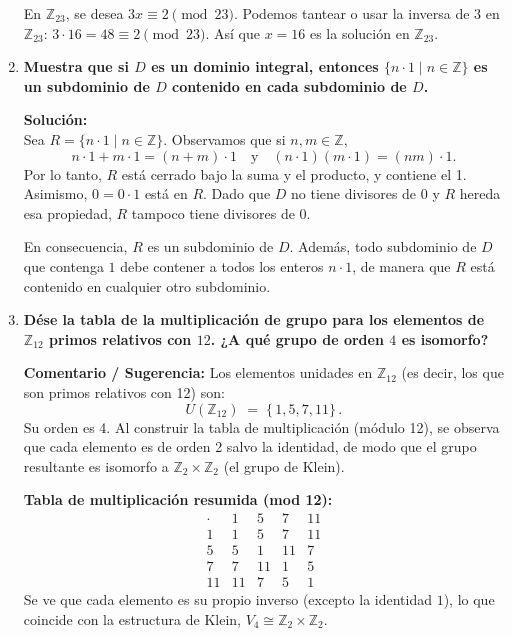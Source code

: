 \documentclass[12pt]{article}
\theoremstyle{definition}
\theoremstyle{remark}
\begin{document}
\begin{enumerate}[label=\textbf{\arabic*.}]
\smallskip

En $\mathbb{Z}_{23}$, se desea $3x \equiv 2 \pmod{23}$. 
Podemos tantear o usar la inversa de $3$ en $\mathbb{Z}_{23}$: 
$3 \cdot 16 = 48 \equiv 2 \pmod{23}$.  
Así que $x = 16$ es la solución en $\mathbb{Z}_{23}$.


\item \textbf{Muestra que si $D$ es un dominio integral, entonces $\{n \cdot 1 \mid n \in \mathbb{Z}\}$ es un subdominio de $D$ contenido en cada subdominio de $D$.}

\textbf{Solución:}\\
Sea $R = \{n \cdot 1 \mid n \in \mathbb{Z}\}$. Observamos que si $n,m \in \mathbb{Z}$, 
\[
n\cdot 1 + m\cdot 1 = (n+m)\cdot 1 \quad\text{y}\quad 
(n\cdot 1)(m\cdot 1) = (nm)\cdot 1.
\]
Por lo tanto, $R$ está cerrado bajo la suma y el producto, y contiene el 1. Asimismo, $0 = 0\cdot 1$ está en $R$. Dado que $D$ no tiene divisores de 0 y $R$ hereda esa propiedad, $R$ tampoco tiene divisores de 0. 

En consecuencia, $R$ es un subdominio de $D$. Además, todo subdominio de $D$ que contenga $1$ debe contener a todos los enteros $n\cdot 1$, de manera que $R$ está contenido en cualquier otro subdominio.


\item \textbf{Dése la tabla de la multiplicación de grupo para los elementos de $\mathbb{Z}_{12}$ primos relativos con $12$. ¿A qué grupo de orden $4$ es isomorfo?}

\textbf{Comentario / Sugerencia:}  
Los elementos unidades en $\mathbb{Z}_{12}$ (es decir, los que son primos relativos con 12) son:
\[
U(\mathbb{Z}_{12}) \;=\; \{\,1, 5, 7, 11\}\,.
\]
Su orden es 4. Al construir la tabla de multiplicación (módulo 12), se observa que cada elemento es de orden 2 salvo la identidad, de modo que el grupo resultante es isomorfo a $\mathbb{Z}_2 \times \mathbb{Z}_2$ (el grupo de Klein).

\smallskip
\textbf{Tabla de multiplicación resumida (mod 12):}
\[
\begin{array}{c|cccc}
\cdot & 1 & 5 & 7 & 11 \\
\hline
1     & 1 & 5 & 7 & 11 \\
5     & 5 & 1 & 11 & 7 \\
7     & 7 & 11 & 1 & 5 \\
11    & 11 & 7 & 5 & 1 
\end{array}
\]
Se ve que cada elemento es su propio inverso (excepto la identidad $1$), lo que coincide con la estructura de Klein, $V_4 \cong \mathbb{Z}_2 \times \mathbb{Z}_2$.



\end{enumerate}
\end{document}
